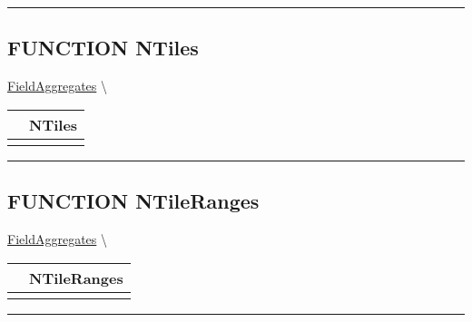 \par


\rule{\linewidth}{0.5pt}
\subsection*{\textsf{\colorbox{headtoc}{\color{white} FUNCTION}
NTiles}}

\hypertarget{ecldoc:ml_core.fieldaggregates.ntiles}{}
\hspace{0pt} \hyperlink{ecldoc:ml_core.fieldaggregates}{FieldAggregates} \textbackslash 

{\renewcommand{\arraystretch}{1.5}
\begin{tabularx}{\textwidth}{|>{\raggedright\arraybackslash}l|X|}
\hline
\hspace{0pt}\mytexttt{\color{red} } & \textbf{NTiles} \\
\hline
\multicolumn{2}{|>{\raggedright\arraybackslash}X|}{\hspace{0pt}\mytexttt{\color{param} (Types.t\_Discrete n)}} \\
\hline
\end{tabularx}
}

\par


\rule{\linewidth}{0.5pt}
\subsection*{\textsf{\colorbox{headtoc}{\color{white} FUNCTION}
NTileRanges}}

\hypertarget{ecldoc:ml_core.fieldaggregates.ntileranges}{}
\hspace{0pt} \hyperlink{ecldoc:ml_core.fieldaggregates}{FieldAggregates} \textbackslash 

{\renewcommand{\arraystretch}{1.5}
\begin{tabularx}{\textwidth}{|>{\raggedright\arraybackslash}l|X|}
\hline
\hspace{0pt}\mytexttt{\color{red} } & \textbf{NTileRanges} \\
\hline
\multicolumn{2}{|>{\raggedright\arraybackslash}X|}{\hspace{0pt}\mytexttt{\color{param} (Types.t\_Discrete n)}} \\
\hline
\end{tabularx}
}

\par


\rule{\linewidth}{0.5pt}


